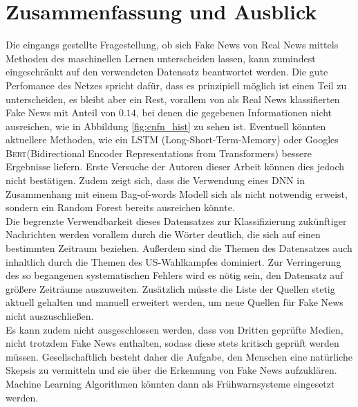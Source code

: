 \chapter{Zusammenfassung und Ausblick}
Die eingangs gestellte Fragestellung, ob sich Fake News von Real News mittels 
Methoden des maschinellen Lernen unterscheiden lassen, kann zumindest eingeschränkt
auf den verwendeten Datensatz beantwortet werden. Die gute Perfomance des Netzes spricht 
dafür, dass es prinzipiell möglich ist einen Teil zu unterscheiden, es bleibt aber ein 
Rest, vorallem von als Real News klassifierten Fake News mit Anteil von $0.14$, bei 
denen die gegebenen Informationen nicht ausreichen, wie in Abbildung \ref{fig:cnfn_hist}
zu sehen ist. Eventuell könnten aktuellere Methoden, wie ein LSTM (Long-Short-Term-Memory)
oder Googles \textsc{Bert}(Bidirectional Encoder Representations from Transformers) bessere
Ergebnisse liefern. Erste Versuche der Autoren dieser Arbeit können dies jedoch nicht bestätigen.
Zudem zeigt sich, dass die Verwendung eines DNN in Zusammenhang mit einem Bag-of-words Modell
sich als nicht notwendig erweist, sondern ein Random Forest bereits ausreichen könnte.\\
Die begrenzte Verwendbarkeit dieses Datensatzes zur Klassifizierung zukünftiger Nachrichten  
werden vorallem durch die Wörter deutlich, die sich auf einen bestimmten Zeitraum beziehen.
Außerdem sind die Themen des Datensatzes auch inhaltlich durch die Themen des US-Wahlkampfes 
dominiert. Zur Verringerung des so begangenen systematischen Fehlers wird es nötig sein,
den Datensatz auf größere Zeiträume auszuweiten. Zusätzlich müsste die Liste der Quellen
stetig aktuell gehalten und manuell erweitert werden, um neue Quellen für Fake News 
nicht auszuschließen. \\
Es kann zudem nicht ausgeschlossen werden, dass von Dritten geprüfte Medien, nicht trotzdem
Fake News enthalten, sodass diese stets kritisch geprüft werden müssen. Gesellschaftlich
besteht daher die Aufgabe, den Menschen eine natürliche Skepsis zu vermitteln und sie über 
die Erkennung von Fake News aufzuklären. Machine Learning Algorithmen könnten dann als 
Frühwarnsysteme eingesetzt werden.